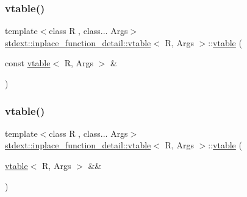 \mbox{\label{structstdext_1_1inplace__function__detail_1_1vtable_abf869e5503c88d7baf3c9098f566f63e}} 
\subsubsection{\texorpdfstring{vtable()}{vtable()}\hspace{0.1cm}{\footnotesize\ttfamily [3/8]}}
{\footnotesize\ttfamily template$<$class R , class... Args$>$ \\
\hyperlink{structstdext_1_1inplace__function__detail_1_1vtable}{stdext\+::inplace\+\_\+function\+\_\+detail\+::vtable}$<$ R, Args $>$\+::\hyperlink{structstdext_1_1inplace__function__detail_1_1vtable}{vtable} (\begin{DoxyParamCaption}\item[{const \hyperlink{structstdext_1_1inplace__function__detail_1_1vtable}{vtable}$<$ R, Args $>$ \&}]{ }\end{DoxyParamCaption})\hspace{0.3cm}{\ttfamily [delete]}}

\mbox{\label{structstdext_1_1inplace__function__detail_1_1vtable_acd6e85bc1036c1681fcef551f9935062}} 
\subsubsection{\texorpdfstring{vtable()}{vtable()}\hspace{0.1cm}{\footnotesize\ttfamily [4/8]}}
{\footnotesize\ttfamily template$<$class R , class... Args$>$ \\
\hyperlink{structstdext_1_1inplace__function__detail_1_1vtable}{stdext\+::inplace\+\_\+function\+\_\+detail\+::vtable}$<$ R, Args $>$\+::\hyperlink{structstdext_1_1inplace__function__detail_1_1vtable}{vtable} (\begin{DoxyParamCaption}\item[{\hyperlink{structstdext_1_1inplace__function__detail_1_1vtable}{vtable}$<$ R, Args $>$ \&\&}]{ }\end{DoxyParamCaption})\hspace{0.3cm}{\ttfamily [delete]}}

